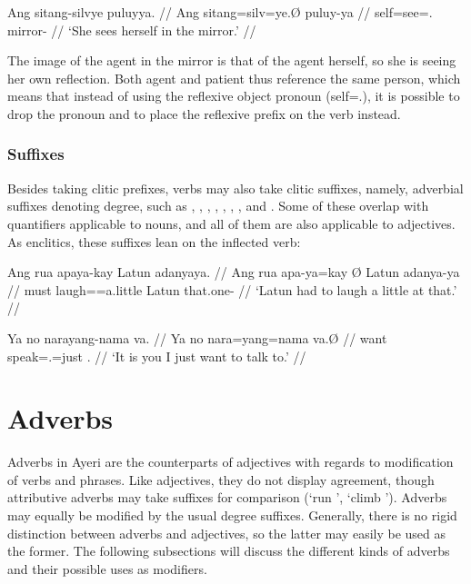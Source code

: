 \ex\begingl
	\gla Ang sitang-silvye puluyya. //
	\glb Ang sitang=silv=ye.Ø puluy-ya //
	\glc \AgtT{} self=see=\TsgF{}.\Top{} mirror-\Loc{} //
	\glft `She sees herself in the mirror.' //
\endgl\xe

The image of the agent in the mirror is that of the agent herself, so she is 
seeing her own reflection. Both agent and patient thus reference the same 
person, which means that instead of using the reflexive object pronoun 
 (self=\TsgF{}.\Parg{}), it is possible to 
drop the pronoun and to place the reflexive prefix on the verb instead.

\subsubsection{Suffixes}
Besides taking clitic prefixes, verbs may also take clitic suffixes, namely, 
adverbial suffixes denoting degree, such as , 
, , 
, , 
, , and 
. Some of these overlap with quantifiers applicable 
to nouns, and all of them are also applicable to adjectives. As enclitics, 
these suffixes lean on the inflected verb:

\pex
\a\label{ex:verbquant}\begingl
	\gla Ang rua apaya-kay {} Latun adanyaya. //
	\glb Ang rua apa-ya=kay Ø Latun adanya-ya //
	\glc \AgtT{} must laugh=\TsgM{}=a.little \Top{} Latun that.one-\Loc{} //
	\glft `Latun had to laugh a little at that.' //
\endgl

\a\begingl
	\gla Ya no narayang-nama va. //
	\glb Ya no nara=yang=nama va.Ø //
	\glc \LocT{} want speak=\Fsg{}.\Aarg{}=just \Ssg{}.\Top{} //
	\glft `It is you I just want to talk to.' //
\endgl
\xe


\section{Adverbs}

Adverbs in Ayeri are the counterparts of adjectives with regards to 
modification of verbs and phrases. Like adjectives, they do not display 
agreement, though attributive adverbs may take suffixes for comparison (`run 
', `climb '). Adverbs may equally be modified by the 
usual degree suffixes. Generally, there is no rigid distinction between adverbs 
and adjectives, so the latter may easily be used as the former. The following 
subsections will discuss the different kinds of adverbs and their possible uses 
as modifiers.

